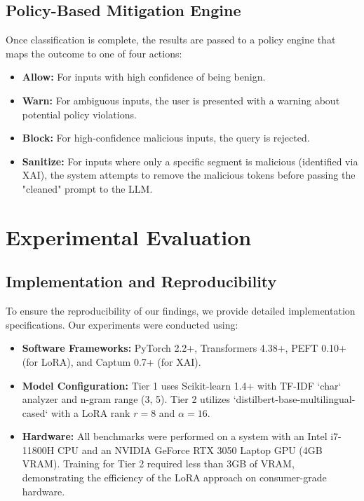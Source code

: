 \documentclass[10pt,conference]{IEEEtran}
\begin{document}
\subsection{Policy-Based Mitigation Engine}
Once classification is complete, the results are passed to a policy engine that maps the outcome to one of four actions:
\begin{itemize}
    \item \textbf{Allow:} For inputs with high confidence of being benign.
    \item \textbf{Warn:} For ambiguous inputs, the user is presented with a warning about potential policy violations.
    \item \textbf{Block:} For high-confidence malicious inputs, the query is rejected.
    \item \textbf{Sanitize:} For inputs where only a specific segment is malicious (identified via XAI), the system attempts to remove the malicious tokens before passing the "cleaned" prompt to the LLM.
\end{itemize}

\section{Experimental Evaluation}

\subsection{Implementation and Reproducibility}
To ensure the reproducibility of our findings, we provide detailed implementation specifications. Our experiments were conducted using:
\begin{itemize}
    \item \textbf{Software Frameworks:} PyTorch 2.2+, Transformers 4.38+, PEFT 0.10+ (for LoRA), and Captum 0.7+ (for XAI).
    \item \textbf{Model Configuration:} Tier 1 uses Scikit-learn 1.4+ with TF-IDF `char` analyzer and n-gram range (3, 5). Tier 2 utilizes `distilbert-base-multilingual-cased` with a LoRA rank $r=8$ and $\alpha=16$.
    \item \textbf{Hardware:} All benchmarks were performed on a system with an Intel i7-11800H CPU and an NVIDIA GeForce RTX 3050 Laptop GPU (4GB VRAM). Training for Tier 2 required less than 3GB of VRAM, demonstrating the efficiency of the LoRA approach on consumer-grade hardware.
\end{itemize}
\end{document}
